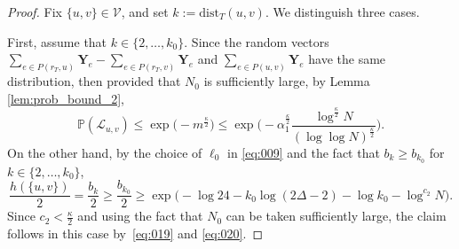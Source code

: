 \documentclass[10pt,a4paper]{amsart}
\begin{document}
\begin{proof}
Fix $\{u,v\}\in\mathcal{V}$, and set $k:=\mathrm{dist}_T(u,v)$. We distinguish three cases.

First, assume that $k\in \{2,\dots,k_0\}$. Since the random vectors
$\sum_{e\in P(r_T,u)}\mathbf{Y}_e - \sum_{e\in P(r_T,v)}\mathbf{Y}_e$ and
$\sum_{e\in P(u,v)}\mathbf{Y}_e $ have the same distribution, then provided that $N_0$ is sufficiently large,
by Lemma \ref{lem:prob_bound_2},
\begin{equation}\label{eq:019}
\mathbb{P}(\mathcal{L}_{u,v})\leqslant \exp\big(- m ^{\frac{\kappa}{2}}\big) \leqslant
\exp\Big(- \alpha_1^{\frac{\kappa}{2}}\frac{\log^{\frac{\kappa}{2}}N}{(\log\log N)^{\frac{\kappa}{2}}}\Big).
\end{equation}
On the other hand, by the choice of $\ell_0$ in \eqref{eq:009} and the fact that $b_k\geqslant b_{k_0}$ for $k\in \{2,\dots, k_0\}$,
\begin{equation}\label{eq:020}
\frac{h(\{u,v\})}{2} =\frac{b_k}{2} \geqslant \frac{b_{k_0}}{2} \geqslant
\exp\big(-\log 24-k_0\log(2\Delta-2)-\log k_0 - \log^{c_2}N\big).
\end{equation}
Since $c_2<\frac{\kappa}{2}$ and using the fact that $N_0$ can be taken sufficiently large, the claim
follows in this case by~\eqref{eq:019} and \eqref{eq:020}.


\end{proof}
\end{document}
